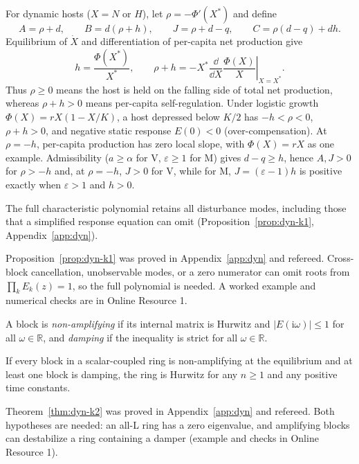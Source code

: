 For dynamic hosts ($X = N$ or $H$), let $\rho = -\Phi'(X^*)$ and define
\begin{equation}\label{eq:dyn-abjc}
A = \rho + d, \qquad B = d(\rho + h), \qquad J = \rho + d - q, \qquad C = \rho(d - q) + dh.
\end{equation}
Equilibrium of $\dot{X}$ and differentiation of per-capita net production give
\begin{equation}\label{eq:dyn-slope}
h = \frac{\Phi(X^*)}{X^*}, \qquad \rho + h = -X^* \left.\frac{\dd}{\dd X}\frac{\Phi(X)}{X}\right|_{X = X^*}.
\end{equation}
Thus $\rho \ge 0$ means the host is held on the falling side of total net production, whereas $\rho + h > 0$ means per-capita self-regulation. Under logistic growth $\Phi(X) = rX(1 - X/K)$, a host depressed below $K/2$ has $-h < \rho < 0$, $\rho + h > 0$, and negative static response $E(0) < 0$ (over-compensation). At $\rho = -h$, per-capita production has zero local slope, with $\Phi(X) = rX$ as one example. Admissibility ($a \ge \alpha$ for V, $\varepsilon \ge 1$ for M) gives $d - q \ge h$, hence $A, J > 0$ for $\rho > -h$ and, at $\rho=-h$, $J>0$ for V, while for M, $J=(\varepsilon-1)h$ is positive exactly when $\varepsilon>1$ and $h>0$.

The full characteristic polynomial retains all disturbance modes, including those that a simplified response equation can omit (Proposition~\ref{prop:dyn-k1}, Appendix~\ref{app:dyn}).

Proposition~\ref{prop:dyn-k1} was proved in Appendix~\ref{app:dyn} and refereed. Cross-block cancellation, unobservable modes, or a zero numerator can omit roots from $\prod_kE_k(z)=1$, so the full polynomial is needed. A worked example and numerical checks are in Online Resource 1.

A block is \emph{non-amplifying} if its internal matrix is Hurwitz and $|E(\mathrm{i}\omega)| \le 1$ for all $\omega \in \mathbb{R}$, and \emph{damping} if the inequality is strict for all $\omega \in \mathbb{R}$.

\begin{theorem}\label{thm:dyn-k2}
If every block in a scalar-coupled ring is non-amplifying at the equilibrium and at least one block is damping, the ring is Hurwitz for any $n \ge 1$ and any positive time constants.
\end{theorem}

Theorem~\ref{thm:dyn-k2} was proved in Appendix~\ref{app:dyn} and refereed. Both hypotheses are needed: an all-L ring has a zero eigenvalue, and amplifying blocks can destabilize a ring containing a damper (example and checks in Online Resource 1).

